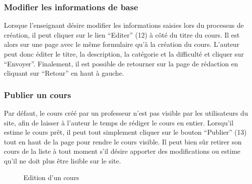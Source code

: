 \documentclass[a4paper,10pt,twoside]{sphinxmanual}
\begin{document}
\subsubsection{Modifier les informations de base}
\label{functionalities:modifier-les-informations-de-base}
Lorsque l'enseignant désire modifier les informations saisies lors du processus de création, il peut cliquer sur le lien ``Editer'' (12) à côté du titre du cours. Il est alors sur une page avec le même formulaire qu'à la création du cours. L'auteur peut donc éditer le titre, la description, la catégorie et la difficulté et cliquer sur ``Envoyer''. Finalement, il est possible de retourner sur la page de rédaction en cliquant sur ``Retour'' en haut à gauche.


\subsubsection{Publier un cours}
\label{functionalities:publier-un-cours}
Par défaut, le cours créé par un professeur n'est pas visible par les utilisateurs du site, afin de laisser à l'auteur le temps de rédiger le cours en entier. Lorsqu'il estime le cours prêt, il peut tout simplement cliquer sur le bouton ``Publier'' (13) tout en haut de la page pour rendre le cours visible. Il peut bien sûr retirer son cours de la liste à tout moment s'il désire apporter des modifications ou estime qu'il ne doit plus être lisible sur le site.
\begin{figure}[htbp]
\centering
\capstart

\caption{Edition d'un cours}\end{figure}
\end{document}

